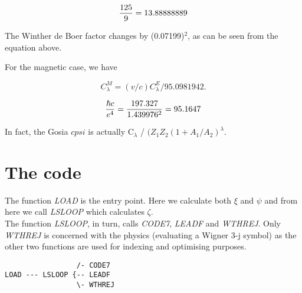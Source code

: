 \begin{equation}
{125 \over 9} = 13.88888889
\end{equation}

The Winther de Boer factor changes by (0.07199)$^2$, as can be seen from the
equation above.

For the magnetic case, we have

\begin{equation}
C_\lambda^M = (v/c) C_\lambda^E / 95.0981942.
\end{equation}

\begin{equation}
{\hbar c \over e^4} = {197.327 \over 1.439976^2} = 95.1647
\end{equation}

In fact, the Gosia $cpsi$ is actually C$_\lambda$ / $(Z_1 Z_2 (1 +
A_1/A_2)^\lambda$.

\section{The code}

The function {\em LOAD} is the entry point. Here we calculate both $\xi$ and
$\psi$ and from here we call {\em LSLOOP} which calculates $\zeta$.\\

The function {\em LSLOOP}, in turn, calls {\em CODE7}, {\em LEADF} and {\em
WTHREJ}. Only {\em WTHREJ} is concerned with the physics (evaluating a
Wigner 3-j symbol) as the other two functions are used for indexing and
optimising purposes.\\

\begin{verbatim}
                 /- CODE7
LOAD --- LSLOOP {-- LEADF
                 \- WTHREJ
\end{verbatim}
